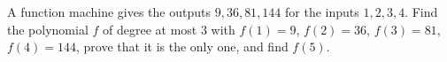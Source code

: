 A function machine gives the outputs $9,36,81,144$ for the inputs $1,2,3,4$. Find the polynomial $f$ of degree at most $3$ with $f(1)=9$, $f(2)=36$, $f(3)=81$, $f(4)=144$, prove that it is the only one, and find $f(5)$.
